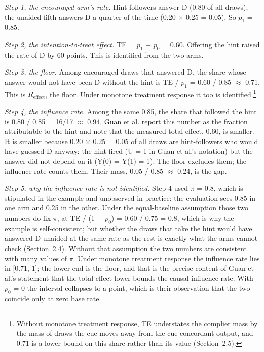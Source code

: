 \documentclass[11pt]{article}
\begin{document}

\emph{Step 1, the encouraged arm’s rate.} Hint-followers answer D (0.80 of all draws); the unaided fifth answers D a quarter of the time (0.20 $\times$ 0.25 = 0.05). So $p_1$ = 0.85.

\emph{Step 2, the intention-to-treat effect.} TE = $p_1$ $-$ $p_0$ = 0.60. Offering the hint raised the rate of D by 60 points. This is identified from the two arms.

\emph{Step 3, the floor.} Among encouraged draws that answered D, the share whose answer would not have been D without the hint is TE / $p_1$ = 0.60 / 0.85 $\approx$ 0.71. This is $R_{\mathrm{effect}}$, the floor. Under monotone treatment response it too is identified.\footnote{Without monotone treatment response, TE understates the complier mass by the mass of draws the cue moves away from the cue-concordant output, and 0.71 is a lower bound on this share rather than its value (Section~2.5).}

\emph{Step 4, the influence rate.} Among the same 0.85, the share that followed the hint is 0.80 / 0.85 = 16/17 $\approx$ 0.94. Guan et al. report this number as the fraction attributable to the hint and note that the measured total effect, 0.60, is smaller. It is smaller because 0.20 $\times$ 0.25 = 0.05 of all draws are hint-followers who would have guessed D anyway: the hint fired (U = 1 in Guan et al.’s notation) but the answer did not depend on it (Y(0) = Y(1) = 1). The floor excludes them; the influence rate counts them. Their mass, 0.05 / 0.85 $\approx$ 0.24, is the gap.

\emph{Step 5, why the influence rate is not identified.} Step 4 used $\pi$ = 0.8, which is stipulated in the example and unobserved in practice: the evaluation sees 0.85 in one arm and 0.25 in the other. Under the equal-baseline assumption those two numbers do fix $\pi$, at TE / (1 $-$ $p_0$) = 0.60 / 0.75 = 0.8, which is why the example is self-consistent; but whether the draws that take the hint would have answered D unaided at the same rate as the rest is exactly what the arms cannot check (Section~2.4). Without that assumption the two numbers are consistent with many values of $\pi$. Under monotone treatment response the influence rate lies in [0.71, 1]; the lower end is the floor, and that is the precise content of Guan et al.’s statement that the total effect lower-bounds the causal influence rate. With $p_0$ = 0 the interval collapses to a point, which is their observation that the two coincide only at zero base rate.
\end{document}

